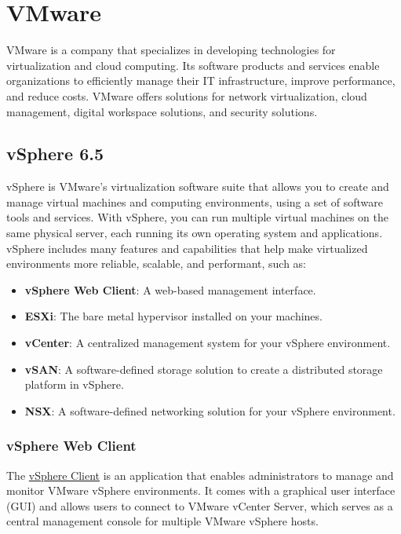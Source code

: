 \section{VMware} \label{section: VMware}

VMware is a company that specializes in developing technologies for virtualization and cloud computing. Its software products and services enable organizations to efficiently manage their IT infrastructure, improve performance, and reduce costs. VMware offers solutions for network virtualization, cloud management, digital workspace solutions, and security solutions.

\subsection{vSphere 6.5}
vSphere is VMware's virtualization software suite that allows you to create and manage virtual machines and computing environments, using a set of software tools and services. With vSphere, you can run multiple virtual machines on the same physical server, each running its own operating system and applications. vSphere includes many features and capabilities that help make virtualized environments more reliable, scalable, and performant, such as: 

\begin{itemize}
    \item \textbf{vSphere Web Client}: A web-based management interface. 
    \item \textbf{ESXi}: The bare metal hypervisor installed on your machines. 
    \item \textbf{vCenter}: A centralized management system for your vSphere environment.
    \item \textbf{vSAN}: A software-defined storage solution to create a distributed storage platform in vSphere.
    \item \textbf{NSX}: A software-defined networking solution for your vSphere environment.
\end{itemize}

\subsubsection{vSphere Web Client}
The \href{https://docs.vmware.com/en/VMware-vSphere/7.0/com.vmware.vsphere.vcenterhost.doc/GUID-A618EF76-638A-49DA-991D-B93C5AC0E2B1.html}{vSphere Client} is an application that enables administrators to manage and monitor VMware vSphere environments. It comes with a graphical user interface (GUI) and allows users to connect to VMware vCenter Server, which serves as a central management console for multiple VMware vSphere hosts.

